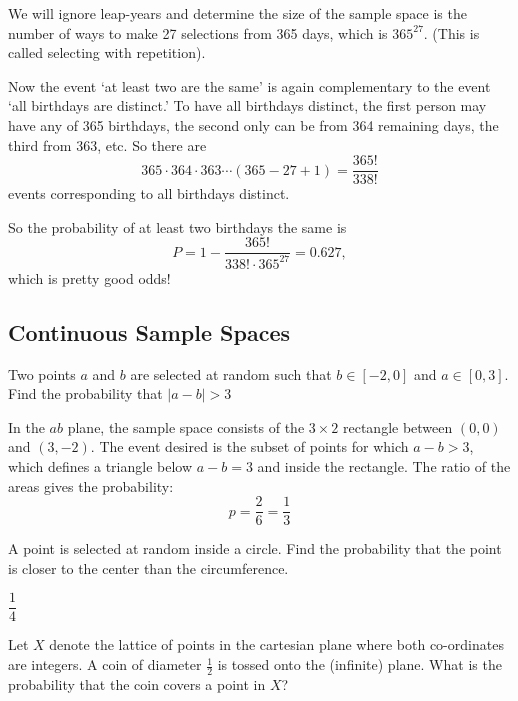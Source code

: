 \documentclass[../main.tex]{subfiles}
\begin{document}
\begin{solution}
	We will ignore leap-years and determine the size of the sample
	space is the number of ways to make 27 selections from 365 days, which is $365^{27}$. (This is called selecting with repetition).
	
	Now the event `at least two are the same' is again complementary to the event `all birthdays are distinct.' To have all birthdays distinct, the first person may have any of 365 birthdays,
	the second only can be from 364 remaining days, the third
	from 363, etc. So there are 
	$$ 365 \cdot 364 \cdot 363 \cdots (365-27+1) = \dfrac{365!}{338!}
	$$ events corresponding to all birthdays distinct.
	
	So the probability of at least two birthdays the same is
	$$ P = 1 - \dfrac{365!}{338! \cdot 365^{27}} = 0.627, $$
	which is pretty good odds!
\end{solution}

\subsection{Continuous Sample Spaces}
\begin{example}
	Two points $a$ and $b$ are selected at random such that
	$b \in [-2,0]$ and $a \in [0,3]$. Find the
	probability that $|a-b| > 3$
\end{example}

\begin{solution}
	In the $ab$ plane, the sample space consists of the
	$3 \times 2$ rectangle between $(0,0)$ and $(3,-2)$.
	The event desired is the subset of points 
	for which $a-b>3$, which defines a triangle below $a-b=3$
	and inside the rectangle. The ratio of the areas gives the
	probability:  
	$$p = \dfrac{2}{6} = \dfrac{1}{3}$$
\end{solution}

\begin{example}
	A point is selected at random inside a circle. Find the probability that the point is closer to the center
	than the circumference.
\end{example}

\begin{solution}[Answer]
	$\dfrac14$
\end{solution}

\begin{example}
	Let $X$ denote the lattice of points in the cartesian 
	plane where both co-ordinates are integers. A coin
	of diameter $\frac12$ is tossed onto the (infinite) plane.
	What is the probability that the coin covers a point in $X$?
\end{example}
\end{document}
